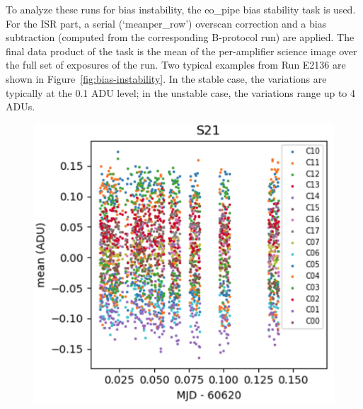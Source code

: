 To analyze these runs for bias instability, the eo\_pipe bias
stability task is used.  For the ISR part, a serial
(`meanper\_row')
overscan correction and a bias subtraction (computed from the
corresponding B-protocol run) are applied. The final data product of the task is the
mean of the per-amplifier science image over the full set of exposures
of the run. Two typical examples from Run E2136 are shown in Figure~\ref{fig:bias-instability}. In the stable case, the variations are typically at the 0.1 ADU
level; in the unstable case, the variations range up to 4 ADUs.

\begin{figure}[h]
\centering
\begin{minipage}[b]{0.5\textwidth}
\centering
\includegraphics[width=\textwidth]{sections/figures/E2136_R21_S21.png}
\end{minipage}
\begin{minipage}[b]{0.45\textwidth}
\centering

\end{minipage}
\end{figure}
